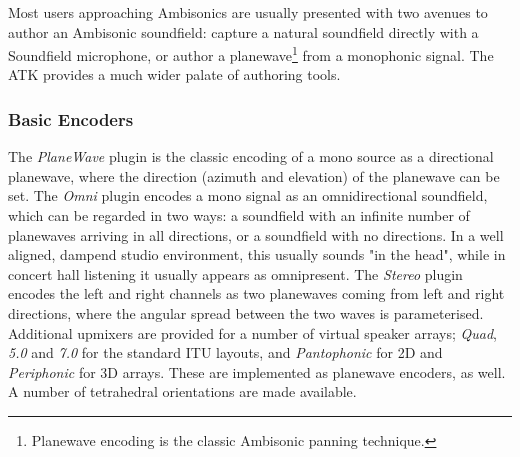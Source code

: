 \documentclass{article}
\begin{document}
Most users approaching Ambisonics are usually presented with two avenues to author an Ambisonic soundfield: capture a natural soundfield directly with a Soundfield microphone, or author a planewave\footnote{Planewave encoding is the classic Ambisonic panning technique.} from a monophonic signal.
The ATK provides a much wider palate of authoring tools.

%

\subsubsection{Basic Encoders}\label{sec:bas-encoders}
The \emph{PlaneWave} plugin is the classic encoding of a mono source as a directional plane\-wave, where the direction (azimuth and elevation) of the planewave can be set.
The \emph{Omni} plugin encodes a mono signal as an omnidirectional soundfield, which can be regarded in two ways:
a soundfield with an infinite number of plane\-waves arriving in all directions, or a soundfield with no directions.
In a well aligned, dampend studio environment, this usually sounds "in the head", while in concert hall listening it usually appears as omnipresent.
The \emph{Stereo} plugin encodes the left and right channels as two planewaves coming from left and right directions, where the angular spread between the two waves is parameterised.
Additional upmixers are provided for a number of virtual spea\-ker arrays; \emph{Quad}, \emph{5.0} and \emph{7.0} for the standard ITU layouts, and \emph{Pantophonic} for 2D and \emph{Periphonic} for 3D arrays.
These are implemented as planewave encoders, as well. A number of tetrahedral orientations are made available.
\end{document}
